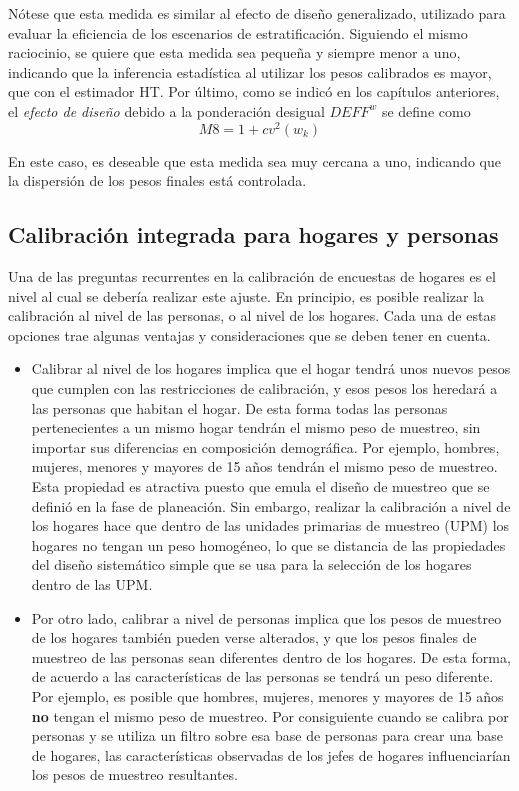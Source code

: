 \documentclass[
  12pt,
  spanish,
]{book}
\begin{document}
Nótese que esta medida es similar al efecto de diseño generalizado, utilizado para evaluar la eficiencia de los escenarios de estratificación. Siguiendo el mismo raciocinio, se quiere que esta medida sea pequeña y siempre menor a uno, indicando que la inferencia estadística al utilizar los pesos calibrados es mayor, que con el estimador HT. Por último, como se indicó en los capítulos anteriores, el \emph{efecto de diseño} debido a la ponderación desigual \(DEFF^w\) se define como
\[
M8 = 1+cv^2(w_k)
\]

En este caso, es deseable que esta medida sea muy cercana a uno, indicando que la dispersión de los pesos finales está controlada.

\hypertarget{calibraciuxf3n-integrada-para-hogares-y-personas}{%
\subsection{Calibración integrada para hogares y personas}\label{calibraciuxf3n-integrada-para-hogares-y-personas}}

Una de las preguntas recurrentes en la calibración de encuestas de hogares es el nivel al cual se debería realizar este ajuste. En principio, es posible realizar la calibración al nivel de las personas, o al nivel de los hogares. Cada una de estas opciones trae algunas ventajas y consideraciones que se deben tener en cuenta.

\begin{itemize}
\item
  Calibrar al nivel de los hogares implica que el hogar tendrá unos nuevos pesos que cumplen con las restricciones de calibración, y esos pesos los heredará a las personas que habitan el hogar. De esta forma todas las personas pertenecientes a un mismo hogar tendrán el mismo peso de muestreo, sin importar sus diferencias en composición demográfica. Por ejemplo, hombres, mujeres, menores y mayores de 15 años tendrán el mismo peso de muestreo. Esta propiedad es atractiva puesto que emula el diseño de muestreo que se definió en la fase de planeación. Sin embargo, realizar la calibración a nivel de los hogares hace que dentro de las unidades primarias de muestreo (UPM) los hogares no tengan un peso homogéneo, lo que se distancia de las propiedades del diseño sistemático simple que se usa para la selección de los hogares dentro de las UPM.
\item
  Por otro lado, calibrar a nivel de personas implica que los pesos de muestreo de los hogares también pueden verse alterados, y que los pesos finales de muestreo de las personas sean diferentes dentro de los hogares. De esta forma, de acuerdo a las características de las personas se tendrá un peso diferente. Por ejemplo, es posible que hombres, mujeres, menores y mayores de 15 años \textbf{no} tengan el mismo peso de muestreo. Por consiguiente cuando se calibra por personas y se utiliza un filtro sobre esa base de personas para crear una base de hogares, las características observadas de los jefes de hogares influenciarían los pesos de muestreo resultantes.
\end{itemize}
\end{document}
